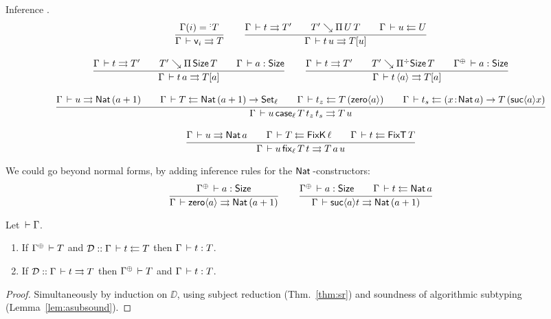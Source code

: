 \documentclass[acmlarge,review,anonymous]{acmart}\settopmatter{printfolios=true}
\begin{document}
Inference .
\begin{gather*}
  \ru{\Gamma(i) = \erann[\noterased] T
    }{\Gamma \der \ind i \jinf T}
\qquad
  \ru{\Gamma \der t \jinf T' \qquad
      T' \evalsto \piT U T \qquad
      \Gamma \der u \jchk U
    }{\Gamma \der t\, u \jinf T[u]}
\\[2ex]
  \ru{\Gamma \der t \jinf T' \qquad
      T' \evalsto \piT \Size T \qquad
      \Gamma \der a : \Size
    }{\Gamma \der t\,a \jinf T[a]}
\qquad
  \ru{\Gamma \der t \jinf T' \qquad
      T' \evalsto \erpiT \Size T \qquad
      \resurrect\Gamma \der a : \Size
    }{\Gamma \der t\,\ann a \jinf T[a]}
\\[2ex]
  \ru{\Gamma \der u \jinf \Nat (a+1) \qquad
      \Gamma \der T \jchk \Nat (a+1) \to \Set[\ell] \qquad
      \Gamma \der t_z \jchk T\,(\zero a) \qquad
      \Gamma \der t_s \jchk \funT x {\Nat a} {T\,(\suc a x)}
    }{\Gamma \der u\, \case[\ell] T {t_z} {t_s} \jinf T\,u}
\\[2ex]
  \ru{\Gamma \der u \jinf \Nat a \qquad
      \Gamma \der T \jchk \FixK\,\ell \qquad
      \Gamma \der t \jchk \FixT\,T
    }{\Gamma \der u\, \fix[\ell] T t \jinf T\,a\,u}
\end{gather*}

We could go beyond normal forms, by adding inference rules for the $\mathsf{Nat}\,$-constructors:
\begin{gather*}
  \ru{\resurrect \Gamma \der a : \Size
    }{\Gamma \der \zero a \jinf \Nat(a+1)}
\qquad
  \ru{\resurrect \Gamma \der a : \Size \qquad
      \Gamma \der t \jchk \Nat a
    }{\Gamma \der \suc a t \jinf \Nat(a+1)}
\end{gather*}

\begin{theorem}
  Let $\,\vdash \Gamma$.
  \begin{enumerate}
  \item If $\resurrect\Gamma \der T$ and $\mathcal{D} :: \Gamma \,\vdash t \leftleftarrows T$ then $\Gamma \,\vdash t : T$.
  \item If $\mathcal{D} :: \Gamma \,\vdash t \rightrightarrows T$ then $\resurrect\Gamma \der T$ and $\Gamma \,\vdash t : T$.
  \end{enumerate}
\end{theorem}
\begin{proof}
  Simultaneously by induction on $\DD$, using subject reduction (Thm.~\ref{thm:sr})
  and soundness of algorithmic subtyping (Lemma~\ref{lem:asubsound}).
\end{proof}
\end{document}
